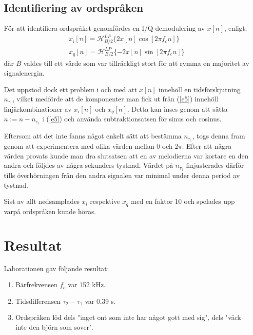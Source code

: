 \documentclass[10pt,twocolumn,a4paper]{article}
\begin{document}
\subsection{Identifiering av ordspråken}

För att identifiera ordspråket genomfördes en I/Q-demodulering av $x[n]$,
enligt:
\begin{multline}
    x_i[n] = \mathcal{H}_{B/2}^{LP} \{ 2 x[n] \cos[2 \pi f_c n] \} \\
    x_q[n] = \mathcal{H}_{B/2}^{LP} \{ -2 x[n] \sin[2 \pi f_c n] \}
    \label{e5}
\end{multline}
där $B$ valdes till ett värde som var tillräckligt stort för att rymma en
majoritet av signalenergin.

Det uppstod dock ett problem i och med att $x[n]$ innehöll en tidsförskjutning
$n_{\tau_1}$, vilket medförde att de komponenter man fick ut från (\ref{e5})
innehöll linjärkombinationer av $x_i[n]$ och $x_q[n]$. Detta kan inses genom
att sätta $n := n - n_{\tau_1}$ i (\ref{e5}) och använda subtraktionsatsen för
sinus och cosinus.

Eftersom att det inte fanns något enkelt sätt att bestämma $n_{\tau_1}$, togs
denna fram genom att experimentera med olika värden mellan $0$ och $2 \pi$.
Efter att några värden provats kunde man dra slutsatsen att en av melodierna
var kortare en den andra och följdes av några sekunders tystnad. Värdet på
$n_{\tau_1}$ finjusterades därför tills överhörningen från den andra signalen
var minimal under denna period av tystnad.

Sist av allt nedsamplades $x_i$ respektive $x_q$ med en faktor 10 och spelades
upp varpå ordspråken kunde höras.
\section{Resultat}

Laborationen gav följande resultat:
\begin{enumerate}
\item Bärfrekvensen $f_c$ var 152 kHz. 
\item Tidsdifferensen $\tau_2 - \tau_1$ var 0.39 s.
\item Ordspråken löd dels "inget ont som inte har något gott med sig", dels "väck inte den björn som sover".
\end{enumerate}

\clearpage
\end{document}
